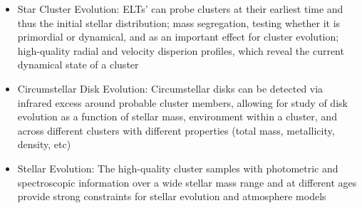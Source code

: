 \documentclass[11pt]{article}
\begin{document}
\begin{itemize}
    \item Star Cluster Evolution: ELTs' can probe clusters at their earliest time and thus the initial stellar distribution; mass segregation, testing whether it is primordial or dynamical, and as an important effect for cluster evolution; high-quality radial and velocity disperion profiles, which reveal the current dynamical state of a cluster
    \item Circumstellar Disk Evolution: Circumstellar disks can be detected via infrared excess around probable cluster members, allowing for study of disk evolution as a function of stellar mass, environment within a cluster, and across different clusters with different properties (total mass, metallicity, density, etc)
    \item Stellar Evolution: The high-quality cluster samples with photometric and spectroscopic information over a wide stellar mass range and at different ages provide strong constraints for stellar evolution and atmosphere models
\end{itemize}






\end{document}
